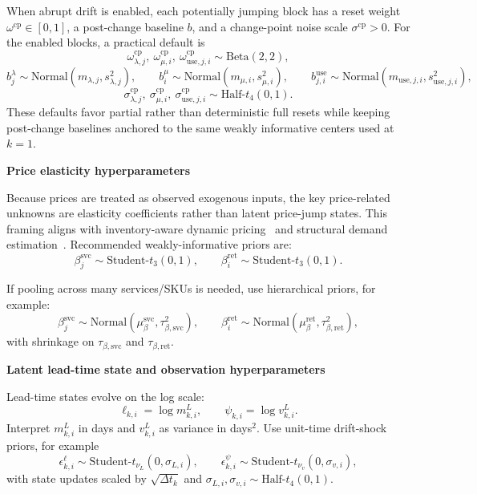 \documentclass[11pt]{article}
\begin{document}
When abrupt drift is enabled, each potentially jumping block has a reset weight $\omega^{\mathrm{cp}}\in[0,1]$, a post-change baseline $b$, and a change-point noise scale $\sigma^{\mathrm{cp}}>0$.
For the enabled blocks, a practical default is
\[
  \omega^{\mathrm{cp}}_{\lambda,j},\ \omega^{\mathrm{cp}}_{\mu,i},\ \omega^{\mathrm{cp}}_{\mathrm{use},j,i} \sim \text{Beta}(2,2),
\]
\[
  b^{\lambda}_j\sim\text{Normal}(m_{\lambda,j},s_{\lambda,j}^2),\qquad
  b^{\mu}_i\sim\text{Normal}(m_{\mu,i},s_{\mu,i}^2),\qquad
  b^{\mathrm{use}}_{j,i}\sim\text{Normal}(m_{\mathrm{use},j,i},s_{\mathrm{use},j,i}^2),
\]
\[
  \sigma^{\mathrm{cp}}_{\lambda,j},\ \sigma^{\mathrm{cp}}_{\mu,i},\ \sigma^{\mathrm{cp}}_{\mathrm{use},j,i} \sim \text{Half-}t_{4}(0,1).
\]
These defaults favor partial rather than deterministic full resets while keeping post-change baselines anchored to the same weakly informative centers used at $k=1$.

\textbf{Price elasticity hyperparameters}

Because prices are treated as observed exogenous inputs, the key price-related unknowns are elasticity coefficients rather than latent price-jump states.
This framing aligns with inventory-aware dynamic pricing~\cite{GallegoVanRyzin1994} and structural demand estimation~\cite{BerryLevinsohnPakes1995,Train2009}.
Recommended weakly-informative priors are:
\[
  \beta^{\mathrm{svc}}_j \sim \text{Student-}t_3(0,1),\qquad
  \beta^{\mathrm{ret}}_i \sim \text{Student-}t_3(0,1).
\]

If pooling across many services/SKUs is needed, use hierarchical priors, for example:
\[
  \beta^{\mathrm{svc}}_j\sim\text{Normal}(\mu_{\beta}^{\mathrm{svc}},\tau_{\beta,\mathrm{svc}}^2),\qquad
  \beta^{\mathrm{ret}}_i\sim\text{Normal}(\mu_{\beta}^{\mathrm{ret}},\tau_{\beta,\mathrm{ret}}^2),
\]
with shrinkage on $\tau_{\beta,\mathrm{svc}}$ and $\tau_{\beta,\mathrm{ret}}$.

\textbf{Latent lead-time state and observation hyperparameters}

Lead-time states evolve on the log scale:
\[
  \ell_{k,i}=\log m^L_{k,i},\qquad \psi_{k,i}=\log v^L_{k,i}.
\]
Interpret $m^L_{k,i}$ in days and $v^L_{k,i}$ as variance in days$^2$.
Use unit-time drift-shock priors, for example
\[
  \epsilon^{\ell}_{k,i}\sim\text{Student-}t_{\nu_L}(0,\sigma_{L,i}),\qquad
  \epsilon^{\psi}_{k,i}\sim\text{Student-}t_{\nu_v}(0,\sigma_{v,i}),
\]
with state updates scaled by $\sqrt{\Delta t_k}$ and $\sigma_{L,i},\sigma_{v,i}\sim\text{Half-}t_{4}(0,1)$.
\end{document}

